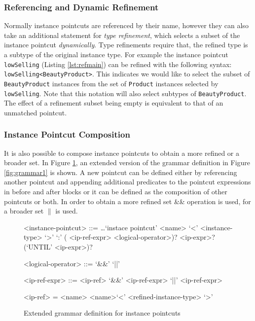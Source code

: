 \documentclass{llncs}
\begin{document}
\subsubsection{Referencing and Dynamic Refinement}
Normally instance pointcuts are referenced by their name, however they can also take an additional statement for \emph{type refinement}, which selects a subset of the instance pointcut \emph{dynamically}. Type refinements require that, the refined type is a subtype of the original instance type. For example the instance pointcut \texttt{lowSelling} (Listing \ref{lst:refmain}) can be refined with the following syntax: \lstinline!lowSelling<BeautyProduct>!. 
This indicates we would like to select the subset of \texttt{BeautyProduct} instances from the set of \texttt{Product} instances selected by \texttt{lowSelling}. 
Note that this notation will also select subtypes of \texttt{BeautyProduct}. 
The effect of a refinement subset being empty is equivalent to that of an unmatched pointcut. 

\subsubsection{Instance Pointcut Composition}
It is also possible to compose instance pointcuts to obtain a more refined or a broader set. In Figure \ref{fig:grammar2}, an extended version of the grammar definition in Figure \ref{fig:grammar1} is shown. A new pointcut can be defined either by referencing another pointcut and appending additional predicates to the pointcut expressions in before and after blocks or it can be defined as the composition of other pointcuts or both. In order to obtain a more refined set \&\& operation is used, for a broader set $\|$ is used.


\begin{figure}[h]
\begin{grammar}
<instance-pointcut> ::= \ldots `instace pointcut' <name> `<' <instance-type> `>' `:'
( <ip-ref-expr> <logical-operator>)? <ip-expr>? (`UNTIL' <ip-expr>)? 

<logical-operator> ::= `&&' \alt `||'

<ip-ref-expr> ::= <ip-ref>  `&&' <ip-ref-expr>  `||' <ip-ref-expr>

<ip-ref> = <name> \alt <name>`<' <refined-instance-type> `>' 
\end{grammar}
\caption{Extended grammar definition for instance pointcuts}
\label{fig:grammar2}
\end{figure}
\end{document}
